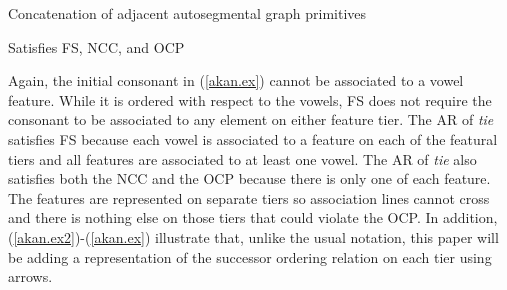 \documentclass[,doc,floatsintext]{apa6}
\theoremstyle{definition}
\theoremstyle{definition}
\theoremstyle{definition}
\theoremstyle{remark}
\begin{document}
\begin{exe}
\ex \label{concat.ex} Concatenation of adjacent autosegmental graph primitives \\
\end{exe}

\begin{exe}
\ex \label{akan.ex} Satisfies FS, NCC, and OCP \\
\end{exe}

Again, the initial consonant in (\ref{akan.ex}) cannot be associated to
a vowel feature. While it is ordered with respect to the vowels, FS does
not require the consonant to be associated to any element on either
feature tier. The AR of \emph{tie} satisfies FS because each vowel is
associated to a feature on each of the featural tiers and all features
are associated to at least one vowel. The AR of \emph{tie} also
satisfies both the NCC and the OCP because there is only one of each
feature. The features are represented on separate tiers so association
lines cannot cross and there is nothing else on those tiers that could
violate the OCP. In addition, (\ref{akan.ex2})-(\ref{akan.ex})
illustrate that, unlike the usual notation, this paper will be adding a
representation of the successor ordering relation on each tier using
arrows.
\end{document}
